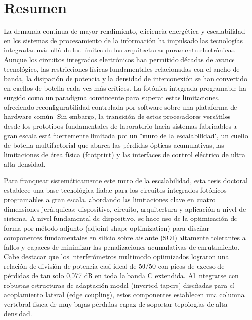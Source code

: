 

\chapter*{Resumen}

La demanda continua de mayor rendimiento, eficiencia energética y escalabilidad en los sistemas de 
procesamiento de la información ha impulsado las tecnologías integradas más allá de los límites de 
las arquitecturas puramente electrónicas. Aunque los circuitos integrados electrónicos han 
permitido décadas de avance tecnológico, las restricciones físicas fundamentales relacionadas con 
el ancho de banda, la disipación de potencia y la densidad de interconexión se han convertido en 
cuellos de botella cada vez más críticos. La fotónica integrada programable ha surgido como un 
paradigma convincente para superar estas limitaciones, ofreciendo reconfigurabilidad controlada por 
software sobre una plataforma de hardware común. Sin embargo, la transición de estos procesadores 
versátiles desde los prototipos fundamentales de laboratorio hacia sistemas fabricables a gran 
escala está fuertemente limitada por un "muro de la escalabilidad", un cuello de botella 
multifactorial que abarca las pérdidas ópticas acumulativas, las limitaciones de área física 
(footprint) y las interfaces de control eléctrico de ultra alta densidad.

Para franquear sistemáticamente este muro de la escalabilidad, esta tesis doctoral establece una 
base tecnológica fiable para los circuitos integrados fotónicos programables a gran escala, 
abordando las limitaciones clave en cuatro dimensiones jerárquicas: dispositivo, circuito, 
arquitectura y aplicación a nivel de sistema. A nivel fundamental de dispositivo, se hace uso de la 
optimización de forma por método adjunto (adjoint shape optimization) para diseñar componentes 
fundamentales en silicio sobre aislante (SOI) altamente tolerantes a fallos y capaces de minimizar 
las penalizaciones acumulativas de enrutamiento. Cabe destacar que los interferómetros multimodo 
optimizados lograron una relación de división de potencia casi ideal de 50/50 con picos de exceso 
de pérdidas de tan solo 0,077 dB en toda la banda C extendida. Al integrarse con robustas 
estructuras de adaptación modal (inverted tapers) diseñadas para el acoplamiento lateral (edge 
coupling), estos componentes establecen una columna vertebral física de muy bajas pérdidas capaz de 
soportar topologías de alta densidad.

